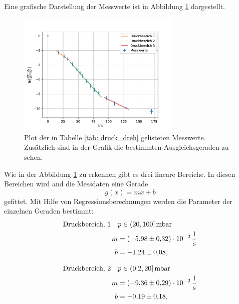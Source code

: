 Eine grafische Darstellung der Messwerte ist in Abbildung \ref{fig: druck_dreh} dargestellt.

\FloatBarrier
\begin{figure}[h]
  \centering
  \includegraphics[width=0.7\textwidth]{../Messdaten/plots/dreh/druckplot_drehschieber.pdf}
  \caption{Plot der in Tabelle \ref{tab: druck_dreh} gelisteten Messwerte. Zusätzlich sind in der Grafik die bestimmten Ausgleichsgeraden zu sehen.}
  \label{fig: druck_dreh}
\end{figure}
\FloatBarrier

Wie in der Abbildung \ref{fig: druck_dreh} zu erkennen gibt es drei lineare Bereiche.
In diesen Bereichen wird and die Messdaten eine Gerade
\begin{equation}
  \label{eq: geradengleichung}
  g(x)=mx+b
\end{equation}
gefittet. Mit Hilfe von Regressionsberechnungen werden die Parameter der einzelnen Geraden bestimmt:
\begin{align}
  \label{eq: regression_dreh_druck_1}
  \begin{aligned}
  \text{Druckbereich, 1} \quad  &p\in(20,100]\,\si{\milli\bar} \\
  m&=\SI{-5.98\pm0.32 e-2}{\per\second} \\
  b&=\num{-1.24 \pm0.08 },
\end{aligned}
\end{align}

\begin{align}
  \label{eq: regression_dreh_druck_2}
  \begin{aligned}
  \text{Druckbereich, 2} \quad  &p\in(0.2,20]\,\si{\milli\bar} \\
  m&=\SI{-9.36\pm0.29 e-2}{\per\second} \\
  b&=\num{-0.19 \pm0.18 },
\end{aligned}
\end{align}

